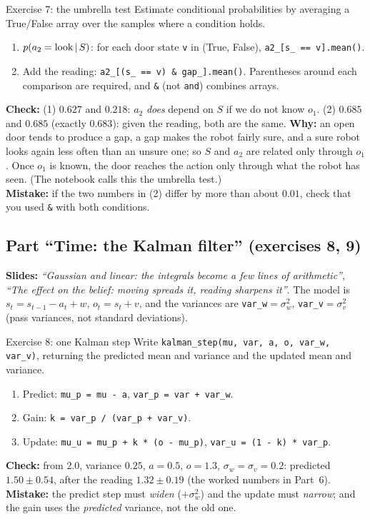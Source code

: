 \documentclass[11pt]{article}
\newcommand{\slide}[1]{\textit{``#1''}}
\begin{document}
\begin{labhelp}{Exercise 7: the umbrella test}
Estimate conditional probabilities by averaging a True/False array over the samples where a condition holds.
\begin{enumerate}[nosep]
\item $p(a_2=\text{look}\,|\, S)$: for each door state \texttt{v} in (True, False), \texttt{a2\_[s\_ == v].mean()}.
\item Add the reading: \texttt{a2\_[(s\_ == v) \& gap\_].mean()}. Parentheses around each comparison are required, and \texttt{\&} (not \texttt{and}) combines arrays.
\end{enumerate}
\textbf{Check:} (1) $0.627$ and $0.218$: $a_2$ \emph{does} depend on $S$ if we do not know $o_1$. (2) $0.685$ and $0.685$ (exactly $0.683$): given the reading, both are the same. 
\textbf{Why:} an open door tends to produce a gap, a gap makes the robot fairly sure, and a sure robot looks again less often than an unsure one; so $S$ and $a_2$ are related only through $o_1$. Once $o_1$ is known, the door reaches the action only through what the robot has seen. (The notebook calls this the umbrella test.)\\
\textbf{Mistake:} if the two numbers in (2) differ by more than about $0.01$, check that you used \texttt{\&} with both conditions.
\end{labhelp}

\subsection*{Part ``Time: the Kalman filter'' (exercises 8, 9)}
\textbf{Slides:} \slide{Gaussian and linear: the integrals become a few lines of arithmetic}, \slide{The effect on the belief: moving spreads it, reading sharpens it}. The model is $s_t=s_{t-1}-a_t+w$, $o_t=s_t+v$, and the variances are \texttt{var\_w}$=\sigma_w^2$, \texttt{var\_v}$=\sigma_v^2$ (pass variances, not standard deviations).

\begin{labhelp}{Exercise 8: one Kalman step}
Write \texttt{kalman\_step(mu, var, a, o, var\_w, var\_v)}, returning the predicted mean and variance and the updated mean and variance.
\begin{enumerate}[nosep]
\item Predict: \texttt{mu\_p = mu - a}, \texttt{var\_p = var + var\_w}.
\item Gain: \texttt{k = var\_p / (var\_p + var\_v)}.
\item Update: \texttt{mu\_u = mu\_p + k * (o - mu\_p)}, \texttt{var\_u = (1 - k) * var\_p}.
\end{enumerate}
\textbf{Check:} from $2.0$, variance $0.25$, $a=0.5$, $o=1.3$, $\sigma_w=\sigma_v=0.2$: predicted $1.50\pm0.54$, after the reading $1.32\pm0.19$ (the worked numbers in Part~6).\\
\textbf{Mistake:} the predict step must \emph{widen} ($+\sigma_w^2$) and the update must \emph{narrow}; and the gain uses the \emph{predicted} variance, not the old one.
\end{labhelp}
\end{document}
